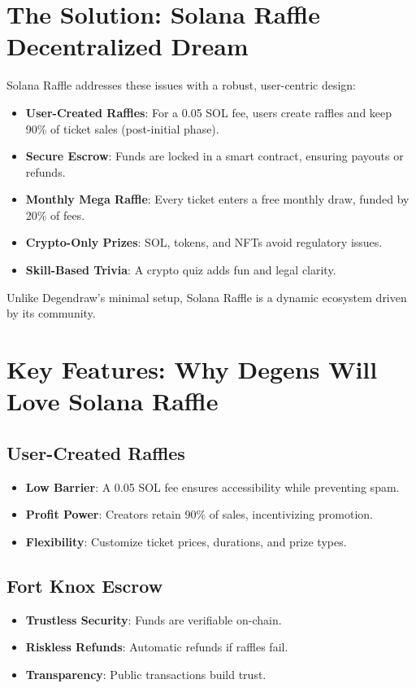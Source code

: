 \documentclass[12pt]{article}
\begin{document}
\section{The Solution: Solana Raffle Decentralized Dream}
Solana Raffle addresses these issues with a robust, user-centric design:
\begin{itemize}
    \item \textbf{User-Created Raffles}: For a 0.05 SOL fee, users create raffles and keep 90\% of ticket sales (post-initial phase).
    \item \textbf{Secure Escrow}: Funds are locked in a smart contract, ensuring payouts or refunds.
    \item \textbf{Monthly Mega Raffle}: Every ticket enters a free monthly draw, funded by 20\% of fees.
    \item \textbf{Crypto-Only Prizes}: SOL, tokens, and NFTs avoid regulatory issues.
    \item \textbf{Skill-Based Trivia}: A crypto quiz adds fun and legal clarity.
\end{itemize}
Unlike Degendraw’s minimal setup, Solana Raffle is a dynamic ecosystem driven by its community.

\section{Key Features: Why Degens Will Love Solana Raffle}
\subsection{User-Created Raffles}
\begin{itemize}
    \item \textbf{Low Barrier}: A 0.05 SOL fee ensures accessibility while preventing spam.
    \item \textbf{Profit Power}: Creators retain 90\% of sales, incentivizing promotion.
    \item \textbf{Flexibility}: Customize ticket prices, durations, and prize types.
\end{itemize}

\subsection{Fort Knox Escrow}
\begin{itemize}
    \item \textbf{Trustless Security}: Funds are verifiable on-chain.
    \item \textbf{Riskless Refunds}: Automatic refunds if raffles fail.
    \item \textbf{Transparency}: Public transactions build trust.
\end{itemize}
\end{document}
